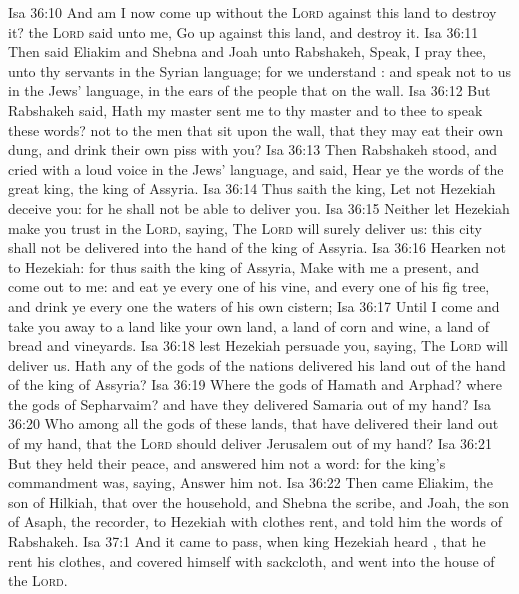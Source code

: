\vs Isa 36:10 And am I now come up without the \textsc{Lord} against this land to destroy it? the \textsc{Lord} said unto me, Go up against this land, and destroy it.
\vs Isa 36:11 Then said Eliakim and Shebna and Joah unto Rabshakeh, Speak, I pray thee, unto thy servants in the Syrian language; for we understand : and speak not to us in the Jews' language, in the ears of the people that  on the wall.
\vs Isa 36:12 But Rabshakeh said, Hath my master sent me to thy master and to thee to speak these words?  not  to the men that sit upon the wall, that they may eat their own dung, and drink their own piss with you?
\vs Isa 36:13 Then Rabshakeh stood, and cried with a loud voice in the Jews' language, and said, Hear ye the words of the great king, the king of Assyria.
\vs Isa 36:14 Thus saith the king, Let not Hezekiah deceive you: for he shall not be able to deliver you.
\vs Isa 36:15 Neither let Hezekiah make you trust in the \textsc{Lord}, saying, The \textsc{Lord} will surely deliver us: this city shall not be delivered into the hand of the king of Assyria.
\vs Isa 36:16 Hearken not to Hezekiah: for thus saith the king of Assyria, Make  with me  a present, and come out to me: and eat ye every one of his vine, and every one of his fig tree, and drink ye every one the waters of his own cistern;
\vs Isa 36:17 Until I come and take you away to a land like your own land, a land of corn and wine, a land of bread and vineyards.
\vs Isa 36:18  lest Hezekiah persuade you, saying, The \textsc{Lord} will deliver us. Hath any of the gods of the nations delivered his land out of the hand of the king of Assyria?
\vs Isa 36:19 Where  the gods of Hamath and Arphad? where  the gods of Sepharvaim? and have they delivered Samaria out of my hand?
\vs Isa 36:20 Who  among all the gods of these lands, that have delivered their land out of my hand, that the \textsc{Lord} should deliver Jerusalem out of my hand?
\vs Isa 36:21 But they held their peace, and answered him not a word: for the king's commandment was, saying, Answer him not.
\vs Isa 36:22 Then came Eliakim, the son of Hilkiah, that  over the household, and Shebna the scribe, and Joah, the son of Asaph, the recorder, to Hezekiah with  clothes rent, and told him the words of Rabshakeh.
\vs Isa 37:1 And it came to pass, when king Hezekiah heard , that he rent his clothes, and covered himself with sackcloth, and went into the house of the \textsc{Lord}.
